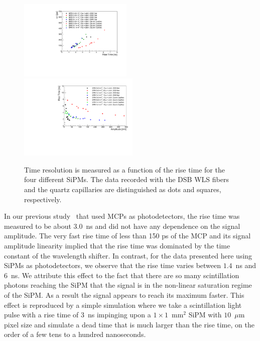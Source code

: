 \begin{figure}[!htb]
\centering
\includegraphics[width=0.48\textwidth]{figures/ShashlikTimeResolutionVsRiseTime.pdf}
\includegraphics[width=0.51\textwidth]{figures/ShashlikRiseTimeVsAmplitude.pdf}
\caption{\label{RiseTime}Time resolution is measured as a function of the rise time
for the four different SiPMs. The data recorded with the DSB WLS fibers and the
quartz capillaries are distinguished as dots and squares, respectively. }
\end{figure}

In our previous study~\cite{Anderson:2015gha} that used MCPs as photodetectors,
the rise time was measured to be about $3.0$~ns and did not have any dependence
on the signal amplitude. The very fast rise time of less than 150 ps of the MCP
and its signal amplitude linearity implied that the rise time was dominated by
the time constant of the wavelength shifter. In contrast, for the data presented
here using SiPMs as photodetectors, we observe that the rise time varies between
$1.4$~ns and $6$~ns. We attribute this effect to the fact that
there are so many scintillation photons reaching the SiPM that the signal is in
the non-linear saturation regime of the SiPM. As a result the signal appears to reach
its maximum faster. This effect is reproduced by a simple simulation where we 
take a scintillation light pulse with a rise time of $3$~ns impinging upon a
$1\times1$~$\mathrm{mm}^{2}$ SiPM with $10$~$\mu$m pixel size and 
simulate a dead time that is much larger than the rise time, on the order of
a few tens to a hundred nanoseconds.

